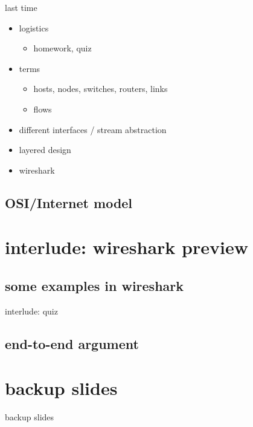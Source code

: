 \date{}
\title{}
\date{}
\usepackage{pgfplots}
\pgfplotsset{compat=1.16}

\begin{frame}
    \titlepage
\end{frame}

\begin{frame}{last time}
    \begin{itemize}
    \item logistics
        \begin{itemize}
        \item homework, quiz
        \end{itemize}
    \item terms
        \begin{itemize}
        \item hosts, nodes, switches, routers, links
        \item flows
        \end{itemize}
    \item different interfaces / stream abstraction
    \item layered design
    \item wireshark
    \end{itemize}
\end{frame}

\subsection{OSI/Internet model}




\section{interlude: wireshark preview}



\subsection{some examples in wireshark}


\begin{frame}{interlude: quiz}
\end{frame}

\subsection{end-to-end argument}






\section{backup slides}
\begin{frame}{backup slides}
\end{frame}


